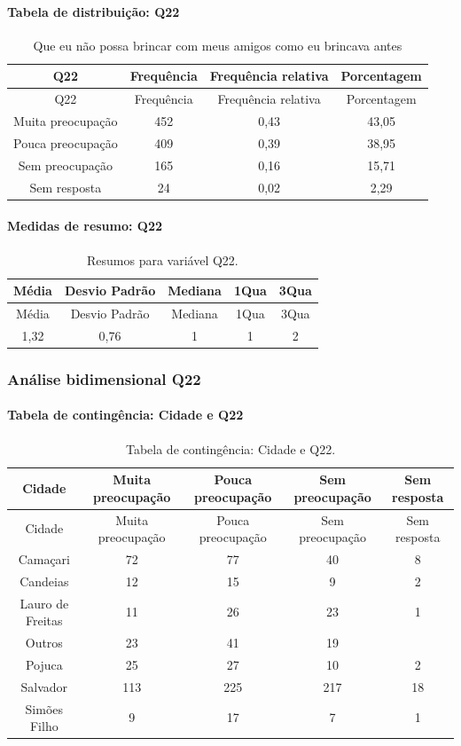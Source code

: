 \documentclass[]{article}
\let\oldparagraph\paragraph
\renewcommand{\paragraph}[1]{\oldparagraph{#1}\mbox{}}
\begin{document}
\hypertarget{tabela-de-distribuiuxe7uxe3o-q22}{%
\paragraph{Tabela de distribuição: Q22}\label{tabela-de-distribuiuxe7uxe3o-q22}}

\begin{longtable}[]{@{}cccc@{}}
\caption{\label{tab:unnamed-chunk-482}Que eu não possa brincar com meus amigos como eu brincava antes}\tabularnewline
\toprule
Q22 & Frequência & Frequência relativa & Porcentagem\tabularnewline
\midrule
\endfirsthead
\toprule
Q22 & Frequência & Frequência relativa & Porcentagem\tabularnewline
\midrule
\endhead
Muita preocupação & 452 & 0,43 & 43,05\tabularnewline
Pouca preocupação & 409 & 0,39 & 38,95\tabularnewline
Sem preocupação & 165 & 0,16 & 15,71\tabularnewline
Sem resposta & 24 & 0,02 & 2,29\tabularnewline
\bottomrule
\end{longtable}

\hypertarget{medidas-de-resumo-q22}{%
\paragraph{Medidas de resumo: Q22}\label{medidas-de-resumo-q22}}

\begin{longtable}[]{@{}ccccc@{}}
\caption{\label{tab:unnamed-chunk-483}Resumos para variável Q22.}\tabularnewline
\toprule
Média & Desvio Padrão & Mediana & 1Qua & 3Qua\tabularnewline
\midrule
\endfirsthead
\toprule
Média & Desvio Padrão & Mediana & 1Qua & 3Qua\tabularnewline
\midrule
\endhead
1,32 & 0,76 & 1 & 1 & 2\tabularnewline
\bottomrule
\end{longtable}

\cleardoublepage

\hypertarget{anuxe1lise-bidimensional-q22}{%
\subsubsection{Análise bidimensional Q22}\label{anuxe1lise-bidimensional-q22}}

\hypertarget{tabela-de-continguxeancia-cidade-e-q22}{%
\paragraph{Tabela de contingência: Cidade e Q22}\label{tabela-de-continguxeancia-cidade-e-q22}}

\begin{longtable}[]{@{}ccccc@{}}
\caption{\label{tab:unnamed-chunk-484}Tabela de contingência: Cidade e Q22.}\tabularnewline
\toprule
Cidade & Muita preocupação & Pouca preocupação & Sem preocupação & Sem resposta\tabularnewline
\midrule
\endfirsthead
\toprule
Cidade & Muita preocupação & Pouca preocupação & Sem preocupação & Sem resposta\tabularnewline
\midrule
\endhead
Camaçari & 72 & 77 & 40 & 8\tabularnewline
Candeias & 12 & 15 & 9 & 2\tabularnewline
Lauro de Freitas & 11 & 26 & 23 & 1\tabularnewline
Outros & 23 & 41 & 19 &\tabularnewline
Pojuca & 25 & 27 & 10 & 2\tabularnewline
Salvador & 113 & 225 & 217 & 18\tabularnewline
Simões Filho & 9 & 17 & 7 & 1\tabularnewline
\bottomrule
\end{longtable}
\end{document}

